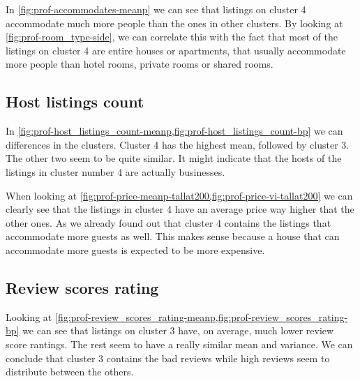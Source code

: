
In \cref{fig:prof-accommodates-meanp} we can see that listings on cluster 4 accommodate
much more people than the ones in other clusters. By looking at \cref{fig:prof-room_type-side}, we can correlate this with the fact that most of the listings on cluster 4 are entire houses or apartments, that usually accommodate more people than hotel rooms, private rooms or shared rooms. 

\clearpage
\subsection{Host listings count}%

In \cref{fig:prof-host_listings_count-meanp,fig:prof-host_listings_count-bp} we can differences in the clusters.
Cluster 4 has the highest mean, followed by cluster 3. The other two seem to be quite 
similar. It might indicate that the hosts of the listings in cluster number 4 are actually businesses.

When looking at \cref{fig:prof-price-meanp-tallat200,fig:prof-price-vi-tallat200} we can clearly see that the listings in cluster 4 have an average price way higher that the other ones. As we already found out that cluster 4 contains the listings that accommodate more guests as well. This makes sense because a house that can accommodate more guests is expected to be more expensive. 


\subsection{Review scores rating}%
\label{sub:prof-review_scores_rating}


Looking at \cref{fig:prof-review_scores_rating-meanp,fig:prof-review_scores_rating-bp} we can see that listings on cluster 3 have, on average, much lower review score rantings. The rest seem to have a really similar mean and variance. We can conclude that cluster 3 contains the bad reviews while high reviews seem to distribute between the others.

